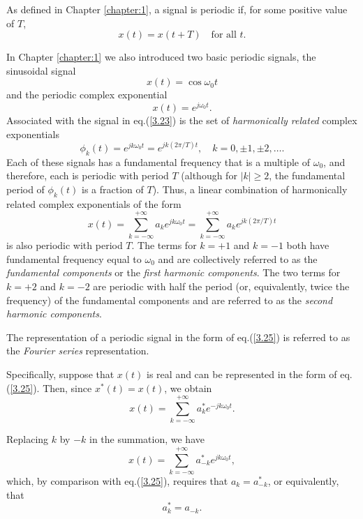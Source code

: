 \documentclass[a4paper,10pt,twoside]{book}
\begin{document}
As defined in Chapter \ref{chapter:1}, a signal is periodic if, for some positive value of $T$,
\begin{equation}
    x(t) = x(t + T)\quad\text{for all }t.
    \label{3.21}
\end{equation}

In Chapter \ref{chapter:1} we also introduced two basic periodic signals, the sinusoidal signal
\begin{equation}
    x(t)=\cos\omega_0t
    \label{3.22}
\end{equation}
and the periodic complex exponential
\begin{equation}
    x(t)=e^{j\omega_0t}.
    \label{3.23}
\end{equation}
Associated with the signal in eq.\;(\ref{3.23}) is the set of \textit{harmonically related} complex exponentials
\begin{equation}
    \phi_k(t) = e^{jk\omega_0t} = e^{jk(2\pi/T)t},\quad k = 0,\pm1,\pm2,\ldots.
    \label{3.24}
\end{equation}
Each of these signals has a fundamental frequency that is a multiple of $\omega_0$, and therefore, each is periodic with period $T$ (although for $|k|\ge 2$, the fundamental period of $\phi_k(t)$ is a fraction of $T$). Thus, a linear combination of harmonically related complex exponentials of the form
\begin{equation}
    x(t) = \sum_{k=-\infty}^{+\infty}a_ke^{jk\omega_0t} = \sum_{k=-\infty}^{+\infty}a_ke^{jk(2\pi/T)t}
    \label{3.25}
\end{equation}
is also periodic with period $T$. The terms for $k=+1$ and $k=-1$ both have fundamental frequency equal to $\omega_0$ and are collectively referred to as the \textit{fundamental components} or the \textit{first harmonic components}. The two terms for $k=+2$ and $k=-2$ are periodic with half the period (or, equivalently, twice the frequency) of the fundamental components and are referred to as the \textit{second harmonic components}.

The representation of a periodic signal in the form of eq.\;(\ref{3.25}) is referred to as the \textit{Fourier series} representation.

Specifically, suppose that $x(t)$ is real and can be represented in the form of eq.\;(\ref{3.25}). Then, since $x^{*}(t)=x(t)$, we obtain $$x(t) = \sum_{k=-\infty}^{+\infty}a_{k}^{*}e^{-jk\omega_{0}t}.$$

Replacing $k$ by $-k$ in the summation, we have $$x(t) = \sum_{k=-\infty}^{+\infty}a_{-k}^{*}e^{jk\omega_{0}t},$$ which, by comparison with eq.\;(\ref{3.25}), requires that $a_k=a_{-k}^*$, or equivalently, that
\begin{equation}
    a_k^*=a_{-k}.
    \label{3.29}
\end{equation}
\end{document}
